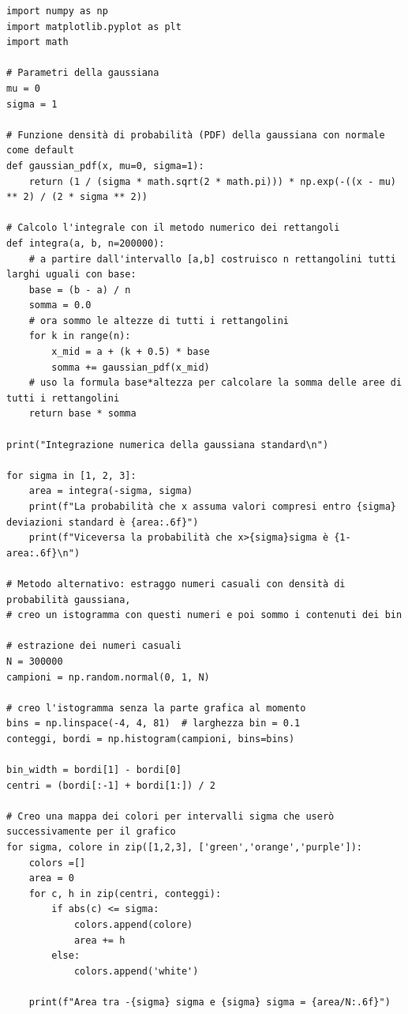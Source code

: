 \documentclass[openany,a4paper,12pt]{book}
\theoremstyle{remark}
\begin{document}
\begin{lstlisting}[caption={Calcolo probabilità e plot della Gaussiana (1, 2 e 3 deviazioni standard)}]
import numpy as np
import matplotlib.pyplot as plt
import math

# Parametri della gaussiana
mu = 0
sigma = 1

# Funzione densità di probabilità (PDF) della gaussiana con normale come default
def gaussian_pdf(x, mu=0, sigma=1):
    return (1 / (sigma * math.sqrt(2 * math.pi))) * np.exp(-((x - mu) ** 2) / (2 * sigma ** 2))

# Calcolo l'integrale con il metodo numerico dei rettangoli 
def integra(a, b, n=200000):
    # a partire dall'intervallo [a,b] costruisco n rettangolini tutti larghi uguali con base:
    base = (b - a) / n
    somma = 0.0
    # ora sommo le altezze di tutti i rettangolini
    for k in range(n):
        x_mid = a + (k + 0.5) * base
        somma += gaussian_pdf(x_mid)
    # uso la formula base*altezza per calcolare la somma delle aree di tutti i rettangolini
    return base * somma

print("Integrazione numerica della gaussiana standard\n")

for sigma in [1, 2, 3]:
    area = integra(-sigma, sigma)
    print(f"La probabilità che x assuma valori compresi entro {sigma} deviazioni standard è {area:.6f}")
    print(f"Viceversa la probabilità che x>{sigma}sigma è {1-area:.6f}\n")

# Metodo alternativo: estraggo numeri casuali con densità di probabilità gaussiana,
# creo un istogramma con questi numeri e poi sommo i contenuti dei bin

# estrazione dei numeri casuali
N = 300000
campioni = np.random.normal(0, 1, N)

# creo l'istogramma senza la parte grafica al momento
bins = np.linspace(-4, 4, 81)  # larghezza bin = 0.1
conteggi, bordi = np.histogram(campioni, bins=bins)

bin_width = bordi[1] - bordi[0]
centri = (bordi[:-1] + bordi[1:]) / 2

# Creo una mappa dei colori per intervalli sigma che userò successivamente per il grafico
for sigma, colore in zip([1,2,3], ['green','orange','purple']):
    colors =[]
    area = 0
    for c, h in zip(centri, conteggi):
        if abs(c) <= sigma:
            colors.append(colore)
            area += h
        else:
            colors.append('white')

    print(f"Area tra -{sigma} sigma e {sigma} sigma = {area/N:.6f}")


\end{lstlisting}
\end{document}
